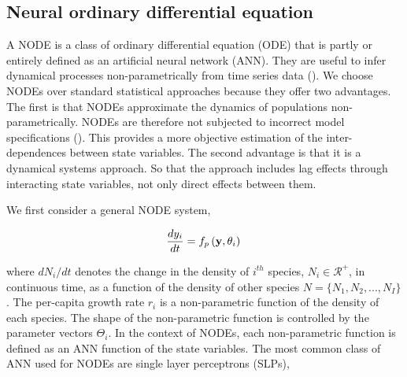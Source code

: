 \documentclass[11pt, oneside]{article}
\begin{document}

\subsection{Neural ordinary differential equation}

A NODE is a class of ordinary differential equation (ODE) that is partly or entirely defined as an artificial neural network (ANN).
They are useful to infer dynamical processes non-parametrically from time series data (\cite{Bonnaffe2021a}).
We choose NODEs over standard statistical approaches because they offer two advantages. 
The first is that NODEs approximate the dynamics of populations non-parametrically.
NODEs are therefore not subjected to incorrect model specifications (\cite{Jost2000,Adamson2013}).
This provides a more objective estimation of the inter-dependences between state variables. 
The second advantage is that it is a dynamical systems approach. 
So that the approach includes lag effects through interacting state variables, not only direct effects between them. 

We first consider a general NODE system,


\vspace{-0.5cm}
\begin{equation}
    \frac{dy_i}{dt} = f_p \left(\mathbf{y},\mathbf{\theta}_i \right) \\
\end{equation}


where $dN_i/dt$ denotes the change in the density of $i^{th}$ species, $N_i \in \mathcal{R}^+$, in continuous time, as a function of the density of other species $N = \{ N_1, N_2, ..., N_I\}$.
The per-capita growth rate $r_i$ is a non-parametric function of the density of each species.
The shape of the non-parametric function is controlled by the parameter vectors $\Theta_i$.
In the context of NODEs, each non-parametric function is defined as an ANN function of the state variables.
The most common class of ANN used for NODEs are single layer perceptrons (SLPs),
\end{document}
